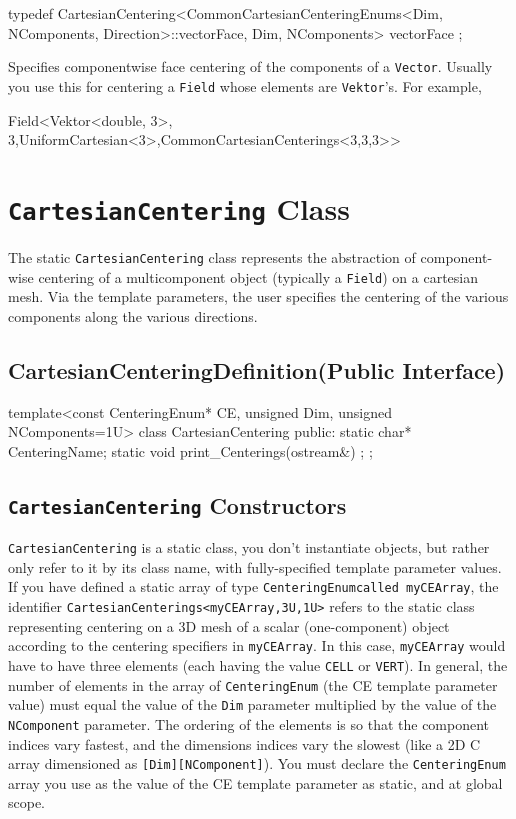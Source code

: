 \begin{smallcode}
typedef CartesianCentering<CommonCartesianCenteringEnums<Dim, NComponents,
Direction>::vectorFace, Dim, NComponents> vectorFace ;
\end{smallcode}

Specifies componentwise face centering of the components of a \texttt{Vector}. Usually you use this for centering a \ippl \texttt{Field} whose elements are \texttt{Vektor}'s. 
For example,
\begin{smallcode}
Field<Vektor<double, 3>, 3,UniformCartesian<3>,CommonCartesianCenterings<3,3,3>>
\end{smallcode}

\section{\texttt{CartesianCentering} Class}
The static \texttt{CartesianCentering} class represents the abstraction of component-wise centering of a multicomponent object (typically a \texttt{Field}) on a cartesian mesh. Via the template parameters, 
the user specifies the centering of the various components along the various directions.
 
\subsection{CartesianCenteringDefinition(Public Interface)}
\begin{smallcode}
template<const CenteringEnum* CE, unsigned Dim, unsigned NComponents=1U>
class CartesianCentering
{
public:
static char* CenteringName; 
static void print_Centerings(ostream&) ;
};
\end{smallcode}
 
\subsection{\texttt{CartesianCentering} Constructors}
\texttt{CartesianCentering} is a static class, you don't instantiate objects, but rather only refer to it by its class name, with fully-specified template parameter values.
If you have defined a static array of type \texttt{CenteringEnumcalled myCEArray}, the identifier \texttt{CartesianCenterings<myCEArray,3U,1U>} refers to the static class 
representing centering on a 3D mesh of a scalar (one-component) object according to the centering specifiers in \texttt{myCEArray}. In this case, \texttt{myCEArray} would 
have to have three elements (each having the value \texttt{CELL} or \texttt{VERT}). 
In general, the number of elements in the array of \texttt{CenteringEnum} (the CE template parameter value) must equal the value of the \texttt{Dim} parameter multiplied by the value of the \texttt{NComponent} parameter. 
The ordering of the elements is so that the component indices vary fastest, and the dimensions indices vary the slowest (like a 2D C array dimensioned as \texttt{[Dim][NComponent]}). 
You must declare the \texttt{CenteringEnum} array you use as the value of the CE template parameter as static, and at global scope.

